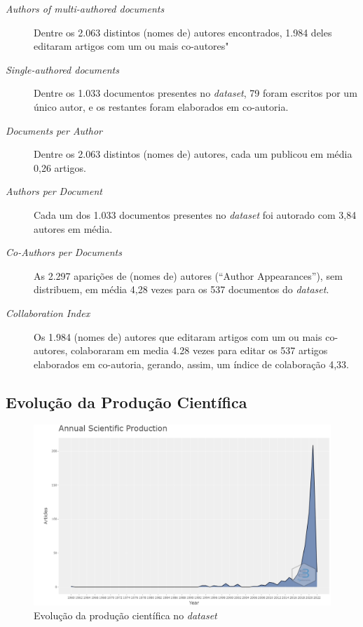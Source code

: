 \begin{description}
    \item [\textit{Authors of multi-authored documents}] Dentre os 2.063 distintos (nomes de) autores encontrados, 1.984 deles editaram artigos com um ou mais co-autores"
    \item [\textit{Single-authored documents}] Dentre os 1.033 documentos presentes no \textit{dataset}, 79 foram escritos por um único autor, e os restantes foram elaborados em co-autoria.
    \item [\textit{Documents per Author}] Dentre os 2.063 distintos (nomes de) autores, cada um publicou em média 0,26 artigos.
    \item [\textit{Authors per Document}] Cada um dos 1.033 documentos presentes no \textit{dataset} foi autorado com 3,84 autores em média.
    \item [\textit{Co-Authors per Documents}] As 2.297 aparições de (nomes de) autores (``Author Appearances''), sem distribuem, em média 4,28 vezes para os 537 documentos do \textit{dataset}.
    \item [\textit{Collaboration Index}] Os 1.984 (nomes de) autores que editaram artigos com um ou mais co-autores, colaboraram em media 4.28 vezes para editar os 537 artigos elaborados em co-autoria, gerando, assim, um índice de colaboração 4,33. 
\end{description}

\subsection{Evolução da Produção Científica}

\begin{figure}
    \centering
    \includegraphics[width=1\textwidth]{experiments/titofrota/PesquisaBibliometrica/Deepfakes/annual-plot.png}
    \caption{Evolução da produção científica no \textit{dataset}}
    \label{fig:evol:anual:DEEPFAKES@titofrota}
\end{figure}

